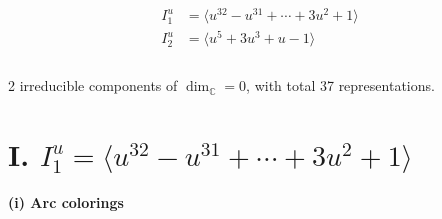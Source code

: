 \documentclass[1p]{elsarticle_modified}
\theoremstyle{definition}
\begin{document}
\begin{align*}
I^u_{1}&=\langle 
u^{32}- u^{31}+\cdots+3 u^2+1\rangle \\
I^u_{2}&=\langle 
u^5+3 u^3+u-1\rangle \\
\\
\end{align*}
\raggedright * 2 irreducible components of $\dim_{\mathbb{C}}=0$, with total 37 representations.\\
\newpage
\renewcommand{\arraystretch}{1}
\centering \section*{I. $I^u_{1}= \langle u^{32}- u^{31}+\cdots+3 u^2+1 \rangle$}
\flushleft \textbf{(i) Arc colorings}\\
\end{document}
